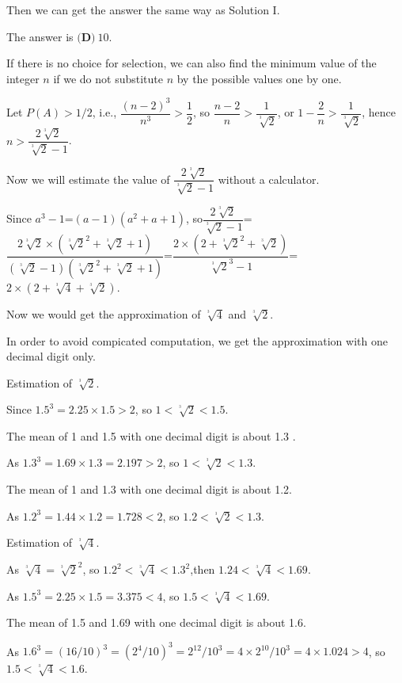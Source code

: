 \begin{enumerate}
 Then we can get the answer the same way as Solution I.

 The answer is $\boxed{\textbf{(D)}\ 10}$.

 


 
If there is no choice for selection, we can also find the minimum value of the integer $n$ if we do not substitute $n$ by the possible values one by one.

 Let $P(A)>1/2$, i.e., $\dfrac{(n-2)^3}{n^3}>\dfrac{1}{2}$,  so $\dfrac{n-2}{n}>\dfrac{1}{\sqrt[^3\!]{2}}$, or $1-\dfrac{2}{n}>\dfrac{1}{\sqrt[^3\!]{2}}$, hence $n>\dfrac{2\sqrt[^3\!]{2}}{\sqrt[^3\!]{2}-1}$.

 Now we will estimate the value of $\dfrac{2\sqrt[^3\!]{2}}{\sqrt[^3\!]{2}-1}$ without a calculator.

 Since $a^3-1$=$(a-1)(a^2+a+1)$, so$\dfrac{2\sqrt[^3\!]{2}}{\sqrt[^3\!]{2}-1}$=$\dfrac{2\sqrt[^3\!]{2}\times\left( \sqrt[^3\!]{2}^2+\sqrt[^3\!]{2}+1\right)}{\left( \sqrt[^3\!]{2}-1\right)\left( \sqrt[^3\!]{2}^2+\sqrt[^3\!]{2}+1\right)}$=$\dfrac{2\times\left( 2+\sqrt[^3\!]{2}^2+\sqrt[^3\!]{2}\right)}{ \sqrt[^3\!]{2}^3-1}$=$2\times\left( 2+\sqrt[^3\!]{4}+\sqrt[^3\!]{2}\right)$.

 Now we would get the approximation of $\sqrt[^3\!]{4}$ and $\sqrt[^3\!]{2}$.

 In order to avoid compicated computation, we get the approximation with one decimal digit only.

 Estimation of $\sqrt[^3\!]{2}$.

 Since $1.5^3=2.25\times1.5>2$, so $1<\sqrt[^3\!]{2}<1.5$.

 The mean of 1 and 1.5 with one decimal digit is about 1.3 .

 As $1.3^3=1.69\times 1.3=2.197>2$, so $1<\sqrt[^3\!]{2}<1.3$.

 The mean of 1 and 1.3 with one decimal digit is about 1.2.

 As $1.2^3=1.44\times 1.2=1.728<2$, so $1.2<\sqrt[^3\!]{2}<1.3$.

 Estimation of $\sqrt[^3\!]{4}$.

 As $\sqrt[^3\!]{4}=\sqrt[^3\!]{2}^2$, so $1.2^2<\sqrt[^3\!]{4}<1.3^2$,then $1.24<\sqrt[^3\!]{4}<1.69$.

 As $1.5^3=2.25\times 1.5=3.375<4$, so $1.5<\sqrt[^3\!]{4}<1.69$.

 The mean of 1.5 and 1.69 with one decimal digit is about 1.6.

 As $1.6^3=(16/10)^3=(2^4/10)^3=2^{12}/10^3=4\times 2^10/10^3=4\times 1.024>4$, so $1.5<\sqrt[^3\!]{4}<1.6$.


\end{enumerate}
